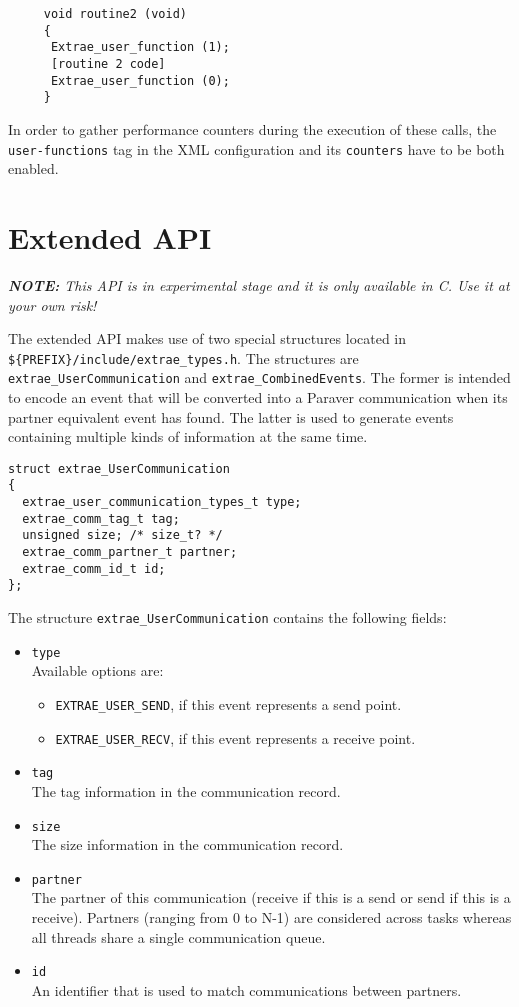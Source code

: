 \begin{itemize}
\begin{verbatim}
     void routine2 (void)
     {
      Extrae_user_function (1);
      [routine 2 code]
      Extrae_user_function (0);
     }
   \end{verbatim}
   In order to gather performance counters during the execution of these calls, the {\tt user-functions} tag in the XML configuration and its {\tt counters} have to be both enabled.

\end{itemize}

\section{Extended API}\label{sec:ExtendedAPI}

{\em {\bf NOTE:} This API is in experimental stage and it is only available in C. Use it at your own risk!}

The extended API makes use of two special structures located in {\tt \$\{PREFIX\}/include/extrae\_types.h}. The structures are {\tt extrae\_UserCommunication} and {\tt extrae\_CombinedEvents}. The former is intended to encode an event that will be converted into a Paraver communication when its partner equivalent event has found. The latter is used to generate events containing multiple kinds of information at the same time.

\begin{verbatim}
struct extrae_UserCommunication
{
  extrae_user_communication_types_t type;
  extrae_comm_tag_t tag;
  unsigned size; /* size_t? */
  extrae_comm_partner_t partner;
  extrae_comm_id_t id;
};
\end{verbatim}

The structure {\tt extrae\_UserCommunication} contains the following fields:
\begin{itemize}
	\item {\tt type}\\
	Available options are:
	\begin{itemize}
		\item {\tt EXTRAE\_USER\_SEND}, if this event represents a send point.
		\item {\tt EXTRAE\_USER\_RECV}, if this event represents a receive point.
	\end{itemize}
	\item {\tt tag}\\
	The tag information in the communication record. 
	\item {\tt size}\\
	The size information in the communication record.
	\item {\tt partner}\\
	The partner of this communication (receive if this is a send or send if this is a receive). Partners (ranging from 0 to N-1) are considered across tasks whereas all threads share a single communication queue.
	\item {\tt id}\\
	An identifier that is used to match communications between partners.
\end{itemize}

